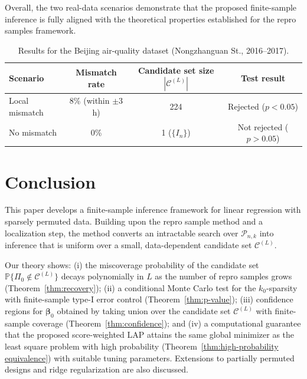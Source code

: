 \documentclass[11pt, reqno]{amsart}
\newcommand{\bP}{\mathbb{P}}
\newcommand{\mC}{\mathcal{C}}
\newcommand{\1}{\mbox{1}\hspace{-0.25em}\mbox{l}}
\theoremstyle{definition}\newtheorem{problem}{Problem}[section]
\theoremstyle{definition}\newtheorem{definition}[problem]{Definition}
\theoremstyle{remark}\newtheorem{assumption}{Assumption}
\theoremstyle{remark}\newtheorem{remark}[problem]{Remark}
\theoremstyle{definition}\newtheorem{example}[problem]{Example}
\theoremstyle{plain}\newtheorem{theorem}[problem]{Theorem}
\theoremstyle{plain}\newtheorem{question}[problem]{Question}
\theoremstyle{plain}\newtheorem{lemma}[problem]{Lemma}
\theoremstyle{plain}\newtheorem{proposition}[problem]{Proposition}
\theoremstyle{plain}\newtheorem{corollary}[problem]{Corollary}
\theoremstyle{plain}\newtheorem{conjecture}[problem]{Conjecture}
\begin{document}
Overall, the two real-data scenarios demonstrate that the proposed finite-sample inference is fully aligned with the theoretical properties established for the repro samples framework.



\begin{table}[htbp]
\centering
\caption{Results for the Beijing air-quality dataset (Nongzhanguan St., 2016–2017).}
\label{tab:realdata}
\begin{tabular}{lccc}
\toprule
\textbf{Scenario} & \textbf{Mismatch rate} & \textbf{Candidate set size} $|\mC^{(L)}|$ & \textbf{Test result} \\
\midrule
Local mismatch & 8\% (within $\pm 3$h) & 224 & Rejected ($p<0.05$) \\
No mismatch & 0\% & 1 ($\{I_n\}$) & Not rejected ($p>0.05$) \\

\bottomrule
\end{tabular}
\end{table}





\section{Conclusion}\label{sec:conclusion}
This paper develops a finite-sample inference framework for linear regression with sparsely permuted data. Building upon the repro sample method and a localization step, the method converts an intractable search over $\mathcal{P}_{n,k}$ into inference that is uniform over a small, data-dependent candidate set $\mathcal{C}^{(L)}$.

Our theory shows: (i) the miscoverage probability of the candidate set $\bP\{\Pi_0\notin \mathcal{C}^{(L)}\}$ decays polynomially in $L$ as the number of repro samples grows (Theorem~\ref{thm:recovery}); (ii) a conditional Monte Carlo test for the $k_0$-sparsity with finite-sample type-I error control (Theorem~\ref{thm:p-value}); (iii) confidence regions for $\bm \beta_0$ obtained by taking union over the candidate set $\mathcal{C}^{(L)}$ with finite-sample coverage (Theorem~\ref{thm:confidence}); and (iv) a computational guarantee that the proposed score-weighted LAP attains the same global minimizer as the least square problem with high probability (Theorem~\ref{thm:high-probability equivalence}) with suitable tuning parameters. Extensions to partially permuted designs and ridge regularization are also discussed.
\end{document}
